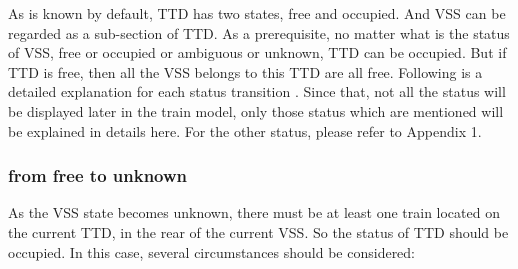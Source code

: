 \documentclass[article,dr=phil,type=msc,colorback,accentcolor=tud9c]{tudthesis}
\begin{document}
  As is known by default, TTD has two states, free and occupied. And VSS can be regarded as a sub-section of TTD. As a prerequisite, no matter what is the status of VSS, free or occupied or ambiguous or unknown, TTD can be occupied. But if TTD is free, then all the VSS belongs to this TTD are all free. Following is a detailed explanation for each status transition \cite{hybridl3}. Since that, not all the status will be displayed later in the train model, only those status which are mentioned will be explained in details here. For the other status, please refer to Appendix 1.  

  \subsubsection{from free to unknown}

  As the VSS state becomes unknown, there must be at least one train located on the current TTD, in the rear of the current VSS. So the status of TTD should be occupied. In this case, several circumstances should be considered:
\end{document}
